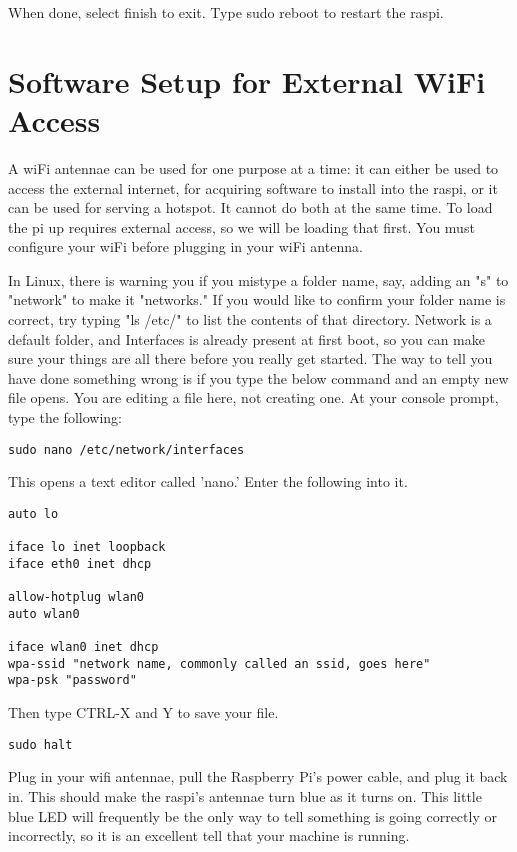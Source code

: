When done, select finish to exit.
Type sudo reboot to restart the raspi.

\section{Software Setup for External WiFi Access}
A wiFi antennae can be used for one purpose at a time: it can either be used to access the external internet, for acquiring software to install into the raspi, or it can be used for serving a hotspot. It cannot do both at the same time. To load the pi up requires external access, so we will be loading that first. You must configure your wiFi before plugging in your wiFi antenna. 

In Linux, there is warning you if you mistype a folder name, say, adding an "s" to "network" to make it "networks." If you would like to confirm your folder name is correct, try typing "ls /etc/" to list the contents of that directory. Network is a default folder, and Interfaces is already present at first boot, so you can make sure your things are all there before you really get started. The way to tell you have done something wrong is if you type the below command and an empty new file opens. You are editing a file here, not creating one.
 At your console prompt, type the following:

\begin{lstlisting}
sudo nano /etc/network/interfaces
\end{lstlisting}

This opens a text editor called 'nano.' Enter the following into it.
\begin{lstlisting}
auto lo

iface lo inet loopback
iface eth0 inet dhcp

allow-hotplug wlan0
auto wlan0

iface wlan0 inet dhcp
wpa-ssid "network name, commonly called an ssid, goes here"
wpa-psk "password"
\end{lstlisting}

Then type CTRL-X and Y to save your file.

\begin{lstlisting}
sudo halt
\end{lstlisting}

Plug in your wifi antennae, pull the Raspberry Pi's power cable, and plug it back in. This should make the raspi's antennae turn blue as it turns on. This little blue LED will frequently be the only way to tell something is going correctly or incorrectly, so it is an excellent tell that your machine is running.

